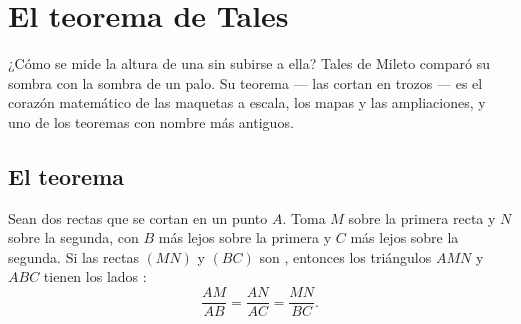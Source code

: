 \chapter{El teorema de Tales}\label{ch:g9:thales}

¿Cómo se mide la altura de una  sin subirse a ella? Tales
de Mileto comparó su sombra con la sombra de un palo. Su teorema
--- las  cortan  en trozos  --- es el
corazón matemático de las maquetas a escala, los mapas y las ampliaciones, y uno de
los teoremas con nombre más antiguos.

\section{El teorema}

\begin{theorem}[Tales]\label{thm:g9:thales:direct}
Sean dos rectas que se cortan en un punto $A$. Toma $M$ sobre la primera recta y $N$
sobre la segunda, con $B$ más lejos sobre la primera y $C$ más lejos sobre
la segunda. Si las rectas $(MN)$ y $(BC)$ son \emph{}, entonces los
triángulos $AMN$ y $ABC$ tienen los lados :
\[
\frac{AM}{AB} = \frac{AN}{AC} = \frac{MN}{BC}.
\]
\end{theorem}
\admitted

